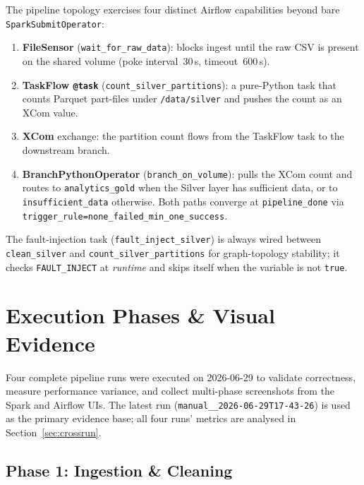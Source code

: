\documentclass{article}
\begin{document}
The pipeline topology exercises four distinct Airflow capabilities beyond bare \texttt{SparkSubmitOperator}:

\begin{enumerate}[nosep]
    \item \textbf{FileSensor} (\texttt{wait\_for\_raw\_data}): blocks ingest until the raw CSV is present on the shared volume (poke interval~30\,s, timeout~600\,s).
    \item \textbf{TaskFlow \texttt{@task}} (\texttt{count\_silver\_partitions}): a pure-Python task that counts Parquet part-files under \texttt{/data/silver} and pushes the count as an XCom value.
    \item \textbf{XCom} exchange: the partition count flows from the TaskFlow task to the downstream branch.
    \item \textbf{BranchPythonOperator} (\texttt{branch\_on\_volume}): pulls the XCom count and routes to \texttt{analytics\_gold} when the Silver layer has sufficient data, or to \texttt{insufficient\_data} otherwise. Both paths converge at \texttt{pipeline\_done} via \texttt{trigger\_rule=none\_failed\_min\_one\_success}.
\end{enumerate}

The fault-injection task (\texttt{fault\_inject\_silver}) is always wired between \texttt{clean\_silver} and \texttt{count\_silver\_partitions} for graph-topology stability; it checks \texttt{FAULT\_INJECT} at \emph{runtime} and skips itself when the variable is not \texttt{true}.



\section{Execution Phases \& Visual Evidence}
\label{sec:execution}

Four complete pipeline runs were executed on 2026-06-29 to validate correctness, measure performance variance, and collect multi-phase screenshots from the Spark and Airflow UIs. The latest run (\texttt{manual\_\_2026-06-29T17-43-26}) is used as the primary evidence base; all four runs' metrics are analysed in Section~\ref{sec:crossrun}.

\subsection{Phase 1: Ingestion \& Cleaning}
\end{document}
